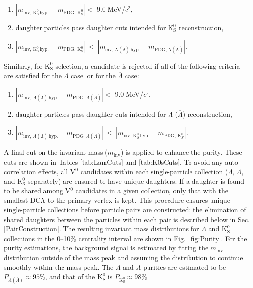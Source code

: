\documentclass[ALICE,manyauthors]{cernphprep}
\newcommand{\minv}{$m_{\mathrm{inv}}$\xspace}
\newcommand{\Lam}{$\Lambda$\xspace}
\newcommand{\ALam}{$\overline{\Lambda}$\xspace}
\newcommand{\LamALam}{$\Lambda$ ($\overline{\Lambda}$)\xspace}
\newcommand{\Ks}{$\mathrm{K^{0}_{S}}$\xspace}
\newcommand{\Vz}{V$^{0}$\xspace}
\begin{document}
\begin{enumerate}
 \item $\left|m_{\mathrm{inv,\,K^{0}_{S}\,hyp.}} - m_{\mathrm{PDG,\,K^{0}_{S}}}\right| < $ 9.0 MeV/$c^{2}$,
 \item daughter particles pass daughter cuts intended for \Ks reconstruction,
 \item $\left|m_{\mathrm{inv,\,K^{0}_{S}\,hyp.}} - m_{\mathrm{PDG,\,K^{0}_{S}}}\right|~ < ~\left|m_{\mathrm{inv,\,\Lambda(\overline{\Lambda})\,hyp.}} - m_{\mathrm{PDG,\,\Lambda(\overline{\Lambda})}}\right|$.
\end{enumerate} 
Similarly, for \Ks selection, a candidate is rejected if all of the following criteria are satisfied for the \Lam case, or for the \ALam case:
\begin{enumerate}
 \item $\left|m_{\mathrm{inv},\,\Lambda(\overline{\Lambda})\,\mathrm{hyp.}} - m_{\mathrm{PDG},\,\Lambda(\overline{\Lambda})}\right| < $ 9.0 MeV/$c^{2}$,
 \item daughter particles pass daughter cuts intended for \LamALam reconstruction,
 \item $\left|m_{\mathrm{inv},\,\Lambda(\overline{\Lambda})\,\mathrm{hyp.}} - m_{\mathrm{PDG},\,\Lambda(\overline{\Lambda})}\right|~ < ~\left|m_{\mathrm{inv},\,\mathrm{K}^{0}_{S}\,\mathrm{hyp.}} - m_{\mathrm{PDG},\,\mathrm{K}^{0}_{S}}\right|$.
\end{enumerate} 

A final cut on the invariant mass (\minv) is applied to enhance the purity.
These cuts are shown in Tables \ref{tab:LamCuts} and \ref{tab:K0sCuts}.
To avoid any auto-correlation effects, all \Vz candidates within each single-particle collection (\Lam, \ALam, and \Ks separately) are ensured to have unique daughters. 
If a daughter is found to be shared among \Vz candidates in a given collection, only that with the smallest DCA to the primary vertex is kept.
This procedure ensures unique single-particle collections before particle pairs are constructed; the elimination of shared daughters between the particles within each pair is described below in Sec. \ref{PairConstruction}.
The resulting invariant mass distributions for \Lam and \Ks collections in the 0--10\% centrality interval are shown in Fig.\ \ref{fig:Purity}.
For the purity estimations, the background signal is estimated by fitting the \minv distribution outside of the mass peak and assuming the distribution to continue smoothly within the mass peak.
The \Lam and \ALam purities are estimated to be $P_{\Lambda(\overline{\Lambda})} \approx 95\%$, and that of the \Ks is $P_{\mathrm{K^{0}_{S}}} \approx 98\%$.
\end{document}
